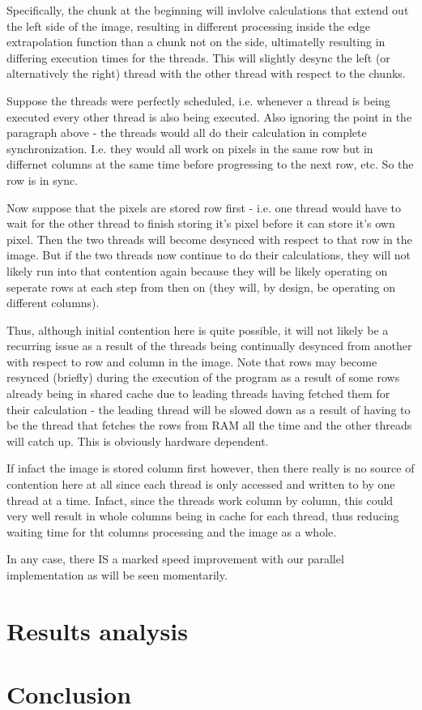 \documentclass[paper=a4, fontsize=11pt]{scrartcl} %
\numberwithin{equation}{section} %
\numberwithin{figure}{section} %
\numberwithin{table}{section} %
\begin{document}
Specifically, the chunk at the beginning will invlolve calculations that extend out the left side of the image, resulting in different processing inside the edge extrapolation function than a chunk not on the side, ultimatelly resulting in differing execution times for the threads. This will slightly desync the left (or alternatively the right) thread with the other thread with respect to the chunks.

Suppose the threads were perfectly scheduled, i.e. whenever a thread is being executed every other thread is also being executed. Also ignoring the point in the paragraph above - the threads would all do their calculation in complete synchronization. I.e. they would all work on pixels in the same row but in differnet columns at the same time before progressing to the next row, etc. So the row is in sync.

Now suppose that the pixels are stored row first - i.e. one thread would have to wait for the other thread to finish storing it's pixel before it can store it's own pixel. Then the two threads will become desynced with respect to that row in the image. But if the two threads now continue to do their calculations, they will not likely run into that contention again because they will be likely operating on seperate rows at each step from then on (they will, by design, be operating on different columns).

Thus, although initial contention here is quite possible, it will not likely be a recurring issue as a result of the threads being continually desynced from another with respect to row and column in the image. Note that rows may become resynced (briefly) during the execution of the program as a result of some rows already being in shared cache due to leading threads having fetched them for their calculation - the leading thread will be slowed down as a result of having to be the thread that fetches the rows from RAM all the time and the other threads will catch up. This is obviously hardware dependent.

If infact the image is stored column first however, then there really is no source of contention here at all since each thread is only accessed and written to by one thread at a time. Infact, since the threads work column by column, this could very well result in whole columns being in cache for each thread, thus reducing waiting time for tht columns processing and the image as a whole.

In any case, there IS a marked speed improvement with our parallel implementation as will be seen momentarily.
\section{Results analysis}

\section{Conclusion}
\end{document}
